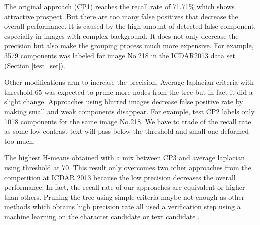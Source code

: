 The original approach (CP1) reaches the recall rate of 71.71\% which shows attractive prospect. But there are too many false positives that decrease the overall performance. It is caused by the high amount of detected false component, especially in images with complex background. It does not only decrease the precision but also make the grouping process much more expensive. For example, 3579 components was labeled for image No.218 in the ICDAR2013 data set (Section \ref{test_set}).


Other modifications arm to increase the precision. Average laplacian criteria with threshold 65 was expected to prune more nodes from the tree but in fact it did a slight change. Approaches using blurred images decrease false positive rate by making small and weak components disappear. For example, test CP2 labels only 1018 components for the same image No.218. We have to trade of the recall rate as some low contrast text will pass below the threshold and small one deformed too much.


The highest H-means obtained with a mix between CP3 and average laplacian using threshold at 70. This result only overcomes two other approaches from the competition at ICDAR 2013 \cite{ICDAR2013} because the low precision decreases the overall performance. In fact, the recall rate of our approaches are equivalent or higher than others. Pruning the tree using simple criteria maybe not enough as other methods which obtains high precision rate all used a verification step using a machine learning on the character candidate or text candidate .

